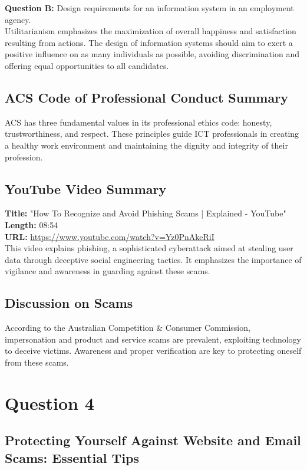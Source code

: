 \documentclass[12pt,a4paper]{article}
\begin{document}
\noindent 
\textbf{Question B:} Design requirements for an information system in an employment agency.\\
Utilitarianism emphasizes the maximization of overall happiness and satisfaction resulting from actions. The design of information systems should aim to exert a positive influence on as many individuals as possible, avoiding discrimination and offering equal opportunities to all candidates.

\subsection*{ACS Code of Professional Conduct Summary}
ACS has three fundamental values in its professional ethics code: honesty, trustworthiness, and respect. These principles guide ICT professionals in creating a healthy work environment and maintaining the dignity and integrity of their profession.

\subsection*{YouTube Video Summary}
\textbf{Title:} "How To Recognize and Avoid Phishing Scams | Explained - YouTube"\\
\textbf{Length:} 08:54\\
\textbf{URL:} \url{https://www.youtube.com/watch?v=Yz0PnAkeRiI}\\
This video explains phishing, a sophisticated cyberattack aimed at stealing user data through deceptive social engineering tactics. It emphasizes the importance of vigilance and awareness in guarding against these scams.

\subsection*{Discussion on Scams}
According to the Australian Competition & Consumer Commission, impersonation and product and service scams are prevalent, exploiting technology to deceive victims. Awareness and proper verification are key to protecting oneself from these scams.


\setcounter{page}{4}

\section{Question 4}
\subsection{Protecting Yourself Against Website and Email Scams: Essential Tips}
\label{sec:Question 4}
\end{document}
